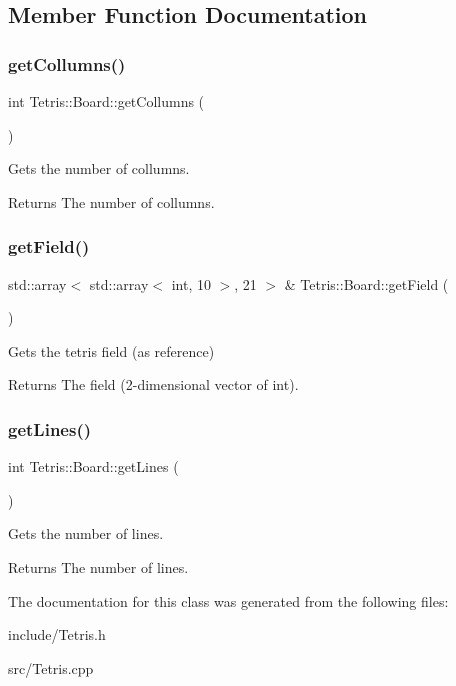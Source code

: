 \subsection{Member Function Documentation}
\mbox{\label{classTetris_1_1Board_abff7a1233d19e4044b7d4ff35a347087}} 
\subsubsection{\texorpdfstring{get\+Collumns()}{getCollumns()}}
{\footnotesize\ttfamily int Tetris\+::\+Board\+::get\+Collumns (\begin{DoxyParamCaption}{ }\end{DoxyParamCaption})}



Gets the number of collumns. 

\begin{DoxyReturn}{Returns}
The number of collumns. 
\end{DoxyReturn}
\mbox{\label{classTetris_1_1Board_acfeb8aabd83fecafeb5b912960ca7623}} 
\subsubsection{\texorpdfstring{get\+Field()}{getField()}}
{\footnotesize\ttfamily std\+::array$<$ std\+::array$<$ int, 10 $>$, 21 $>$ \& Tetris\+::\+Board\+::get\+Field (\begin{DoxyParamCaption}{ }\end{DoxyParamCaption})}



Gets the tetris field (as reference) 

\begin{DoxyReturn}{Returns}
The field (2-\/dimensional vector of int). 
\end{DoxyReturn}
\mbox{\label{classTetris_1_1Board_a53a614c61a25dfb508ccb45f235bb3b5}} 
\subsubsection{\texorpdfstring{get\+Lines()}{getLines()}}
{\footnotesize\ttfamily int Tetris\+::\+Board\+::get\+Lines (\begin{DoxyParamCaption}{ }\end{DoxyParamCaption})}



Gets the number of lines. 

\begin{DoxyReturn}{Returns}
The number of lines. 
\end{DoxyReturn}


The documentation for this class was generated from the following files\+:\begin{DoxyCompactItemize}
\item 
include/Tetris.\+h\item 
src/Tetris.\+cpp\end{DoxyCompactItemize}
